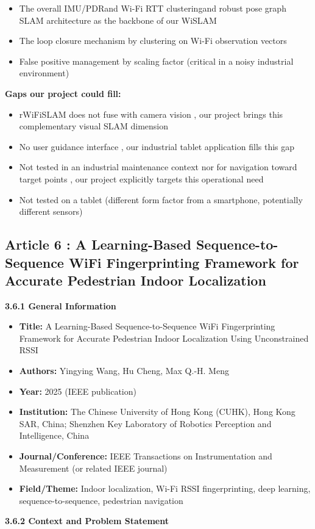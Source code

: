 \documentclass{ipgpmaster}
\begin{document}
\begin{itemize}
    \item The overall IMU/PDRand  Wi-Fi RTT clusteringand  robust pose graph SLAM architecture as the backbone of our WiSLAM
    \item The loop closure mechanism by clustering on Wi-Fi observation vectors
    \item False positive management by scaling factor (critical in a noisy industrial environment)
\end{itemize}
\textbf{Gaps our project could fill:}

\begin{itemize}
    \item rWiFiSLAM does not fuse with camera vision ,  our project brings this complementary visual SLAM dimension
    \item No user guidance interface ,  our industrial tablet application fills this gap
    \item Not tested in an industrial maintenance context nor for navigation toward target points ,  our project explicitly targets this operational need
    \item Not tested on a tablet (different form factor from a smartphone, potentially different sensors)
\end{itemize}

\subsection{Article 6 : A Learning-Based Sequence-to-Sequence WiFi Fingerprinting Framework for Accurate Pedestrian Indoor Localization
}
\textbf{3.6.1 General Information}

\begin{itemize}
    \item \textbf{Title:} A Learning-Based Sequence-to-Sequence WiFi Fingerprinting Framework for Accurate Pedestrian Indoor Localization Using Unconstrained RSSI
    \item \textbf{Authors:} Yingying Wang, Hu Cheng, Max Q.-H. Meng
    \item \textbf{Year:} 2025 (IEEE publication)
    \item \textbf{Institution:} The Chinese University of Hong Kong (CUHK), Hong Kong SAR, China; Shenzhen Key Laboratory of Robotics Perception and Intelligence, China
    \item \textbf{Journal/Conference:} IEEE Transactions on Instrumentation and Measurement (or related IEEE journal)
    \item \textbf{Field/Theme:} Indoor localization, Wi-Fi RSSI fingerprinting, deep learning, sequence-to-sequence, pedestrian navigation

\end{itemize}
\textbf{3.6.2    Context and Problem Statement}
\end{document}

